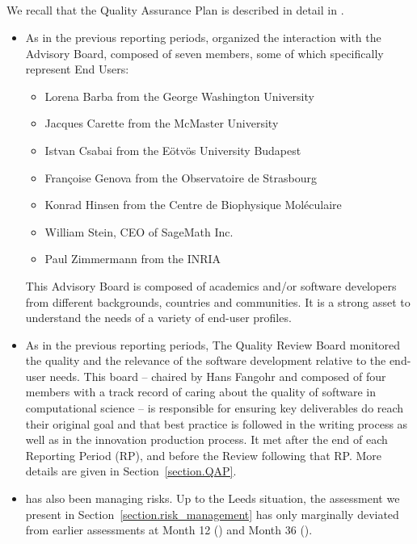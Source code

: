 \subparagraph{}

We recall that the Quality Assurance Plan is described in detail in
.

\begin{itemize}
\item As in the previous reporting periods,  organized the
  interaction with the Advisory Board, composed of seven members, some
  of which specifically represent End Users:
  \begin{itemize}
  \item{Lorena Barba from the George Washington University}
  \item{Jacques Carette from the McMaster University}
  \item{Istvan Csabai from the Eötvös University Budapest}
  \item{Françoise Genova from the Observatoire de Strasbourg}
  \item{Konrad Hinsen from the Centre de Biophysique Moléculaire}
  \item{William Stein, CEO of SageMath Inc.}
  \item{Paul Zimmermann from the INRIA}
  \end{itemize}
  This Advisory Board is composed of academics and/or software
  developers from different backgrounds, countries and communities. It
  is a strong asset to understand the needs of a variety of end-user
  profiles.

\item As in the previous reporting periods, The Quality Review Board
  monitored the quality and the relevance of the software development
  relative to the end-user needs. This board -- chaired by Hans
  Fangohr and composed of four members with a track record of caring
  about the quality of software in computational science -- is
  responsible for ensuring key deliverables do reach their original
  goal and that best practice is followed in the writing process as
  well as in the innovation production process. It met after the end
  of each Reporting Period (RP), and before the Review following that
  RP. More details are given in Section~\ref{section.QAP}.


\item {} has also been managing risks. Up to the Leeds
  situation, the assessment we present in
  Section~\ref{section.risk_management} has only marginally deviated
  from earlier assessments at Month 12 ()
  and Month 36 ().
\end{itemize}
\subparagraph{}

